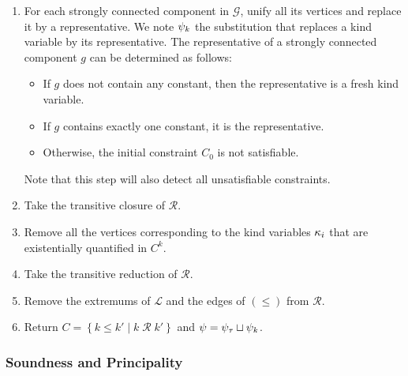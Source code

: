 \begin{enumerate}
\item For each strongly connected component in $\mathcal G$, unify all its vertices and replace it by a representative.
  We note $\mathrm{\psi}_k$ the substitution that replaces a kind variable by
  its representative.
  The representative of a strongly connected component $g$ can be determined as follows:
  \begin{itemize}
  \item If $g$ does not contain any constant, then the representative
    is a fresh kind variable.
  \item If $g$ contains exactly one constant, it is the representative.
  \item Otherwise, the initial constraint $C_0$ is not satisfiable.
  \end{itemize}
  Note that this step will also detect all unsatisfiable constraints.
\item Take the transitive closure of $\mathcal R$.
\item Remove all the vertices corresponding to the kind variables $\kappa_i$
  that are existentially quantified in $C^k$.
\item Take the transitive reduction of $\mathcal R$.
\item Remove the extremums of $\mathcal L$ and the edges of $(\leq)$
  from $\mathcal R$.
\item Return $C = \left\{ k \leq k' \mid k \operatorname{\mathcal R}k' \right\}$
  and $\mathrm{\psi} =  \mathrm{\psi}_\tau \sqcup \mathrm{\psi}_k$.
\end{enumerate}


\subsubsection{Soundness and Principality}

